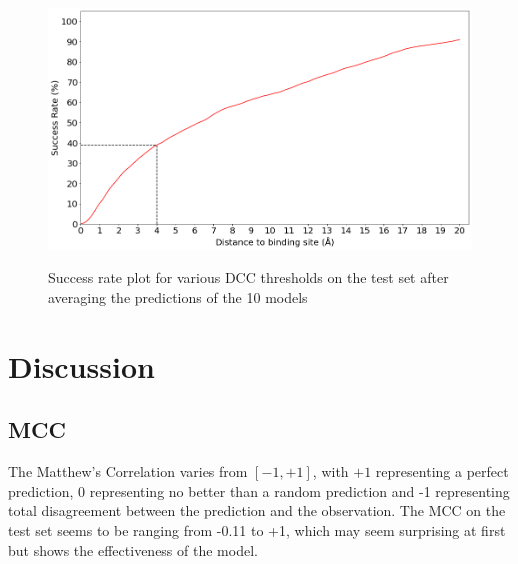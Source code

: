 \documentclass[journal=jacsat,manuscript=article]{achemso}
\begin{document}
\begin{figure}
    \caption{\centering Success rate plot for various DCC thresholds on the test set after averaging the predictions of the 10 models}
    \centering
    \noindent\includegraphics[scale=0.45]{test_dcc.png}
    \label{fig:test_dcc}
\end{figure}









\section{Discussion}
\subsection{MCC}
\quad The Matthew's Correlation varies from $[-1, +1]$, with $+1$ representing a perfect prediction, 0 representing no better than a random prediction and -1 representing total disagreement between the prediction and the observation. The MCC on the test set seems to be ranging from -0.11 to +1, which may seem surprising at first but shows the effectiveness of the model.
\end{document}
